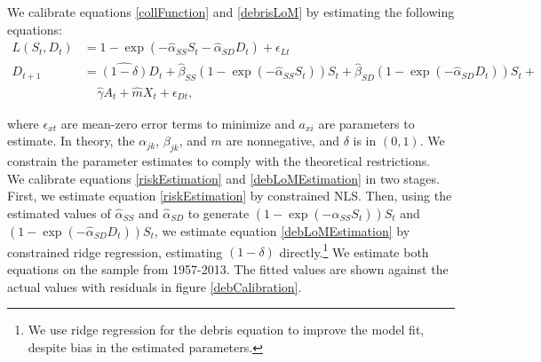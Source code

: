 \documentclass[12pt]{article}
\begin{document}
We calibrate equations \ref{collFunction} and \ref{debrisLoM} by estimating the following equations:
\begin{align}
\label{riskEstimation}
L(S_t,D_t) &= 1 - \exp(-\hat{\alpha}_{SS} S_t-\hat{\alpha}_{SD} D_t) + \epsilon_{L t}  \\
\label{debLoMEstimation}
D_{t+1} &= \hat{(1-\delta)} D_t + \hat{\beta}_{SS} (1-\exp(-\hat{\alpha}_{SS}S_t))S_t + \hat{\beta}_{SD} (1-\exp(-\hat{\alpha}_{SD}D_t))S_t + \\
&~~~~~  \hat{\gamma} A_t + \hat{m} X_t + \epsilon_{D t},
\end{align}

where $\epsilon_{xt}$ are mean-zero error terms to minimize and $a_{xi}$ are parameters to estimate. In theory, the $\alpha_{jk}$, $\beta_{jk}$, and $m$ are nonnegative, and $\delta$ is in $(0,1)$. We constrain the parameter estimates to comply with the theoretical restrictions.\\

We calibrate equations \ref{riskEstimation} and \ref{debLoMEstimation} in two stages. First, we estimate equation \ref{riskEstimation} by constrained NLS. Then, using the estimated values of $\hat{\alpha}_{SS}$ and $\hat{\alpha}_{SD}$ to generate $(1-\exp(-\hat{\alpha}_{SS}S_t))S_t$ and $(1-\exp(-\hat{\alpha}_{SD}D_t))S_t$, we estimate equation \ref{debLoMEstimation} by constrained ridge regression, estimating $(1-\delta)$ directly.\footnote{We use ridge regression for the debris equation to improve the model fit, despite bias in the estimated parameters.} We estimate both equations on the sample from 1957-2013. The fitted values are shown against the actual values with residuals in figure \ref{debCalibration}.
\end{document}
